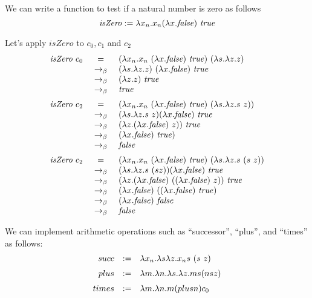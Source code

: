 \begin{flex}
\begin{gram}
\label{grm:lcc:church-numerals::iszero}
We can write a function to test if a natural number is zero as follows
\[
\mathit{isZero} := \lambda x_n.  x_n  (\lambda x. \mathit{false})~\mathit{true}
\]
\end{gram}

\begin{example}
\label{xmpl:lcc:church-numerals::iszero}
Let's apply $isZero$ to $c_0, c_1$ and $c_2$
\[
\begin{array}{rcl}
\mathit{isZero}~ c_0 & =     & (\lambda x_n.  x_n~ (\lambda x. \mathit{false})~\mathit{true})~ (\lambda s. \lambda z. z)\\
           & ~\rightarrow_{\beta}~ &   (\lambda s. \lambda z. z)~ (\lambda x. \mathit{false})~\mathit{true}\\
           & ~\rightarrow_{\beta}~ &  (\lambda z. z)~\mathit{true}\\
           & ~\rightarrow_{\beta}~ &  \mathit{true}\\[2mm]

\mathit{isZero}~ c_2 & =     & (\lambda x_n.  x_n~  (\lambda x. \mathit{false})~\mathit{true})~ (\lambda s. \lambda z. s~z))\\
           & ~\rightarrow_{\beta}~ &   (\lambda s. \lambda z. s~ z) (\lambda x. \mathit{false})~\mathit{true}\\
           & ~\rightarrow_{\beta}~ &   (\lambda z. (\lambda x. \mathit{false})~ z))~\mathit{true}\\
           & ~\rightarrow_{\beta}~ &   (\lambda x. \mathit{false})~\mathit{true})\\
           & ~\rightarrow_{\beta}~ &   \mathit{false}\\[2mm]

\mathit{isZero}~ c_2 & =     & (\lambda x_n.  x_n~  (\lambda x. \mathit{false})~\mathit{true})~ (\lambda s. \lambda z. s~ (s~z))\\
           & ~\rightarrow_{\beta}~ &   (\lambda s. \lambda z. s~ (s z)) (\lambda x. \mathit{false})~\mathit{true}\\
           & ~\rightarrow_{\beta}~ &   (\lambda z. (\lambda x. \mathit{false})~ ((\lambda x. \mathit{false})~ z))~\mathit{true}\\
           & ~\rightarrow_{\beta}~ &   (\lambda x. \mathit{false})~ ((\lambda x. \mathit{false})~ \mathit{true})\\
           & ~\rightarrow_{\beta}~ &   (\lambda x. \mathit{false})~ \mathit{false}\\
           & ~\rightarrow_{\beta}~ &   \mathit{false}
\end{array}
\]
\end{example}
\end{flex}

\begin{gram}
\label{grm:lcc:church-numerals::arithmetic}
We can implement arithmetic operations such as ``successor'', ``plus'', and ``times'' as follows:
\[
\begin{array}{rcl}
succ  & := & \lambda x_n. \lambda s \lambda z. x_n s~ (s~ z)
\\[2mm]
plus  & := & \lambda m. \lambda n. \lambda s. \lambda z. m s (n s z)
\\[2mm]
times & := & \lambda m. \lambda n. m (plus n) c_0
\\[2mm]
\end{array}
\]
\end{gram}

